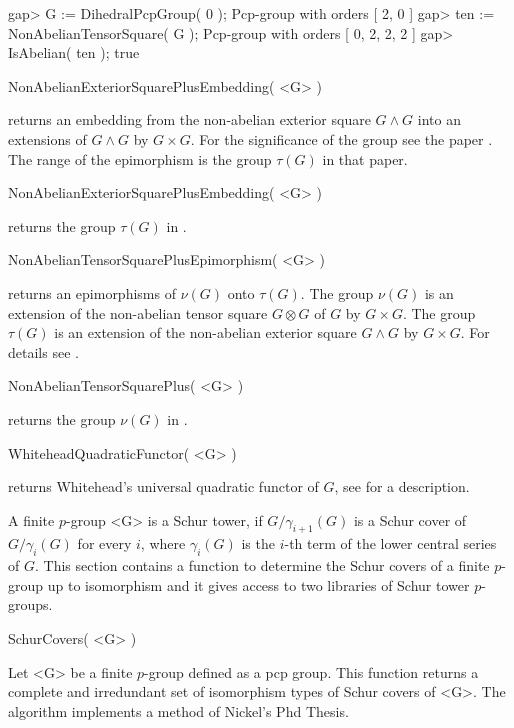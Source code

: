 gap> G := DihedralPcpGroup( 0 );
Pcp-group with orders [ 2, 0 ]
gap> ten := NonAbelianTensorSquare( G );
Pcp-group with orders [ 0, 2, 2, 2 ]
gap> IsAbelian( ten );
true
\endexample

\>NonAbelianExteriorSquarePlusEmbedding( <G> )

returns an embedding from  the non-abelian exterior square $G\wedge G$
into  an  extensions   of  $G\wedge  G$  by  $G\times   G$.   For  the
significance  of the  group  see the  paper \cite{EickNickel07}.   The
range of the epimorphism is the group $\tau(G)$ in that paper.

\>NonAbelianExteriorSquarePlusEmbedding( <G> )

returns the group $\tau(G)$ in \cite{EickNickel07}.

\>NonAbelianTensorSquarePlusEpimorphism( <G> )

returns  an  epimorphisms  of  $\nu(G)$  onto  $\tau(G)$.   The  group
$\nu(G)$ is an extension of the non-abelian tensor square $G\otimes G$
of $G$  by $G\times G$.   The group $\tau(G)$  is an extension  of the
non-abelian exterior  square $G\wedge G$ by $G\times  G$.  For details
see \cite{EickNickel07}.

\>NonAbelianTensorSquarePlus( <G> )

returns the group $\nu(G)$ in \cite{EickNickel07}.


\> WhiteheadQuadraticFunctor( <G> )

returns Whitehead's universal quadratic functor of $G$, see
\cite{EickNickel07} for a description.


A finite $p$-group <G> is a Schur tower, if $G/\gamma_{i+1}(G)$ is a
Schur cover of $G/\gamma_i(G)$ for every $i$, where $\gamma_i(G)$ is
the $i$-th term of the lower central series of $G$. This section 
contains a function to determine the Schur covers of a finite $p$-group
up to isomorphism and it gives access to two libraries of Schur tower
$p$-groups.

\>SchurCovers( <G> )

Let <G> be a finite $p$-group defined as a pcp group. This function
returns a complete and irredundant set of isomorphism types of Schur
covers of <G>. The algorithm implements a method of Nickel's Phd Thesis.

